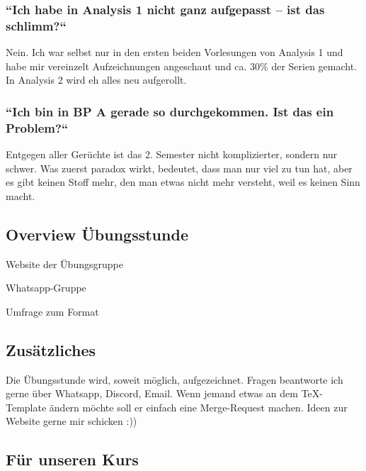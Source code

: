 \documentclass[11pt,a4paper]{article}
\begin{document}
\subsubsection{``Ich habe in Analysis 1 nicht ganz aufgepasst – ist das schlimm{?}``}
Nein. Ich war selbst nur in den ersten beiden Vorlesungen von Analysis 1 und habe mir vereinzelt Aufzeichnungen angeschaut und ca. 30\% der Serien gemacht. In Analysis 2 wird eh alles neu aufgerollt.

\subsubsection{``Ich bin in BP A gerade so durchgekommen. Ist das ein Problem{?}``}
Entgegen aller Gerüchte ist das 2. Semester nicht komplizierter, sondern nur schwer. Was zuerst paradox wirkt, bedeutet, dass man nur viel zu tun hat, aber es gibt keinen Stoff mehr, den man etwas nicht mehr versteht, weil es keinen Sinn macht.

\subsection{Overview Übungsstunde}
\centering

\begin{minipage}{0.8\linewidth}
    Website der Übungsgruppe
    \hfill  
\end{minipage}

\vfill %
\begin{minipage}{0.8\linewidth}  
    Whatsapp-Gruppe
    \hfill  
\end{minipage}
\vfill
\begin{minipage}{0.8\linewidth}
    Umfrage zum Format
    \hfill  
\end{minipage}

\raggedright
\subsection{Zusätzliches}
Die Übungsstunde wird, soweit möglich, aufgezeichnet. Fragen beantworte ich gerne über Whatsapp, Discord, Email. Wenn jemand etwas an dem TeX-Template ändern möchte soll er einfach eine Merge-Request machen. Ideen zur Website gerne mir schicken :))
\newpage
\subsection{Für unseren Kurs}
\end{document}
